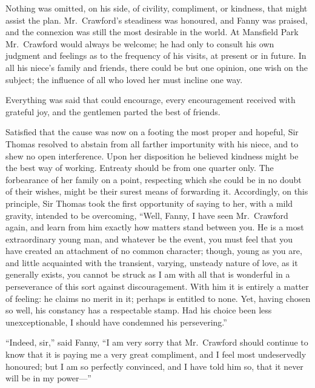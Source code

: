 \documentclass{article}
\begin{document}
Nothing was omitted, on his side, of civility, compliment,
or kindness, that might assist the plan.  Mr.\ Crawford's
steadiness was honoured, and Fanny was praised, and the
connexion was still the most desirable in the world.
At Mansfield Park Mr.\ Crawford would always be welcome;
he had only to consult his own judgment and feelings as
to the frequency of his visits, at present or in future.
In all his niece's family and friends, there could be
but one opinion, one wish on the subject; the influence
of all who loved her must incline one way.

Everything was said that could encourage, every encouragement
received with grateful joy, and the gentlemen parted
the best of friends.

Satisfied that the cause was now on a footing the most
proper and hopeful, Sir Thomas resolved to abstain
from all farther importunity with his niece, and to
shew no open interference.  Upon her disposition he
believed kindness might be the best way of working.
Entreaty should be from one quarter only.  The forbearance
of her family on a point, respecting which she could
be in no doubt of their wishes, might be their surest
means of forwarding it.  Accordingly, on this principle,
Sir Thomas took the first opportunity of saying to her,
with a mild gravity, intended to be overcoming,
``Well, Fanny, I have seen Mr.\ Crawford again, and learn
from him exactly how matters stand between you.  He is
a most extraordinary young man, and whatever be the event,
you must feel that you have created an attachment of no
common character; though, young as you are, and little
acquainted with the transient, varying, unsteady nature
of love, as it generally exists, you cannot be struck
as I am with all that is wonderful in a perseverance
of this sort against discouragement.  With him it is
entirely a matter of feeling:  he claims no merit in it;
perhaps is entitled to none.  Yet, having chosen so well,
his constancy has a respectable stamp.  Had his choice
been less unexceptionable, I should have condemned
his persevering.''

``Indeed, sir,'' said Fanny, ``I am very sorry that Mr.\ Crawford
should continue to know that it is paying me a very
great compliment, and I feel most undeservedly honoured;
but I am so perfectly convinced, and I have told him so,
that it never will be in my power---''
\end{document}
